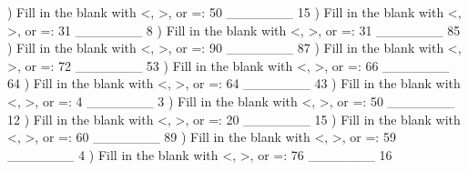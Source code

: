 \documentclass{article}%
\begin{document}
) Fill in the blank with <, >, or =: 50 \_\_\_\_\_\_\_ 15%
\newline%
\newline%
) Fill in the blank with <, >, or =: 31 \_\_\_\_\_\_\_ 8%
\newline%
\newline%
) Fill in the blank with <, >, or =: 31 \_\_\_\_\_\_\_ 85%
\newline%
\newline%
) Fill in the blank with <, >, or =: 90 \_\_\_\_\_\_\_ 87%
\newline%
\newline%
) Fill in the blank with <, >, or =: 72 \_\_\_\_\_\_\_ 53%
\newline%
\newline%
) Fill in the blank with <, >, or =: 66 \_\_\_\_\_\_\_ 64%
\newline%
\newline%
) Fill in the blank with <, >, or =: 64 \_\_\_\_\_\_\_ 43%
\newline%
\newline%
) Fill in the blank with <, >, or =: 4 \_\_\_\_\_\_\_ 3%
\newline%
\newline%
) Fill in the blank with <, >, or =: 50 \_\_\_\_\_\_\_ 12%
\newline%
\newline%
) Fill in the blank with <, >, or =: 20 \_\_\_\_\_\_\_ 15%
\newline%
\newline%
) Fill in the blank with <, >, or =: 60 \_\_\_\_\_\_\_ 89%
\newline%
\newline%
) Fill in the blank with <, >, or =: 59 \_\_\_\_\_\_\_ 4%
\newline%
\newline%
) Fill in the blank with <, >, or =: 76 \_\_\_\_\_\_\_ 16%
\end{document}
